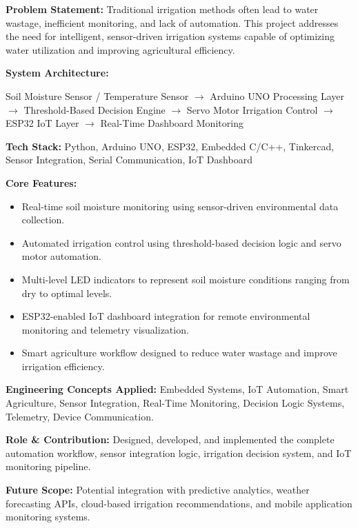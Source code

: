 \documentclass[a4paper,11pt]{article}
\begin{document}
\textbf{Problem Statement:}
Traditional irrigation methods often lead to water wastage, inefficient monitoring, and lack of automation. This project addresses the need for intelligent, sensor-driven irrigation systems capable of optimizing water utilization and improving agricultural efficiency.

\textbf{System Architecture:}

Soil Moisture Sensor / Temperature Sensor
$\rightarrow$ Arduino UNO Processing Layer
$\rightarrow$ Threshold-Based Decision Engine
$\rightarrow$ Servo Motor Irrigation Control
$\rightarrow$ ESP32 IoT Layer
$\rightarrow$ Real-Time Dashboard Monitoring

\textbf{Tech Stack:}
Python, Arduino UNO, ESP32, Embedded C/C++, Tinkercad, Sensor Integration, Serial Communication, IoT Dashboard

\textbf{Core Features:}
\begin{itemize}
    \item Real-time soil moisture monitoring using sensor-driven environmental data collection.
    
    \item Automated irrigation control using threshold-based decision logic and servo motor automation.
    
    \item Multi-level LED indicators to represent soil moisture conditions ranging from dry to optimal levels.
    
    \item ESP32-enabled IoT dashboard integration for remote environmental monitoring and telemetry visualization.
    
    \item Smart agriculture workflow designed to reduce water wastage and improve irrigation efficiency.
\end{itemize}

\textbf{Engineering Concepts Applied:}
Embedded Systems, IoT Automation, Smart Agriculture, Sensor Integration, Real-Time Monitoring, Decision Logic Systems, Telemetry, Device Communication.

\textbf{Role \& Contribution:}
Designed, developed, and implemented the complete automation workflow, sensor integration logic, irrigation decision system, and IoT monitoring pipeline.

\textbf{Future Scope:}
Potential integration with predictive analytics, weather forecasting APIs, cloud-based irrigation recommendations, and mobile application monitoring systems.
\end{document}
